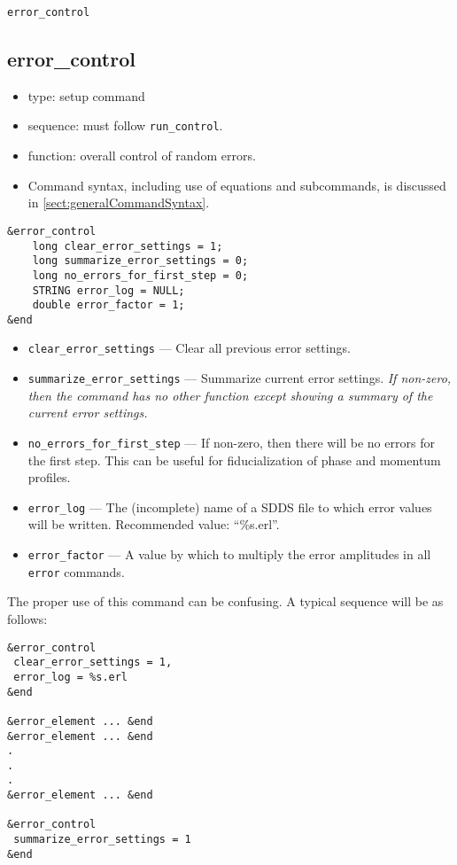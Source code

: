 \documentclass[11pt]{article}
\begin{document}
\newpage
\begin{center}{\Large\verb|error_control|}\end{center}
\subsection{error\_control \label{subsec:errorcontrol}}

\begin{itemize}
\item type: setup command
\item sequence: must follow \verb|run_control|.
\item function: overall control of random errors.
\item Command syntax, including use of equations and subcommands, is discussed in \ref{sect:generalCommandSyntax}.
\end{itemize}

\begin{verbatim}
&error_control
    long clear_error_settings = 1;
    long summarize_error_settings = 0;
    long no_errors_for_first_step = 0;
    STRING error_log = NULL;
    double error_factor = 1;
&end
\end{verbatim}

\begin{itemize}
\item \verb|clear_error_settings| --- Clear all previous error settings.
\item \verb|summarize_error_settings| --- Summarize current error settings.  {\em If non-zero, then the command has no other function  except
    showing a summary of the current error settings.}
\item \verb|no_errors_for_first_step| --- If non-zero, then there will be no errors for the first step.  This can be useful for
 fiducialization of phase and momentum profiles.
\item \verb|error_log| --- The (incomplete) name of a SDDS file to which error values will be written.  Recommended value: ``\%s.erl''.
\item \verb|error_factor| --- A value by which to multiply the error amplitudes in all \verb|error| commands.
\end{itemize}

The proper use of this command can be confusing.  A typical sequence will be as follows:
\begin{verbatim}
&error_control
 clear_error_settings = 1,
 error_log = %s.erl
&end

&error_element ... &end
&error_element ... &end
.
.
.
&error_element ... &end

&error_control
 summarize_error_settings = 1
&end
\end{verbatim}
\end{document}
